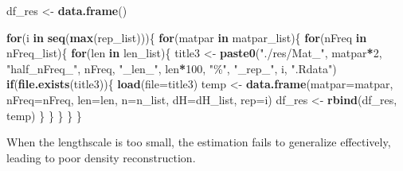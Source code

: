\documentclass[
]{article}
\newenvironment{Shaded}{\begin{snugshade}}{\end{snugshade}}
\newcommand{\AttributeTok}[1]{\textcolor[rgb]{0.13,0.29,0.53}{#1}}
\newcommand{\ControlFlowTok}[1]{\textcolor[rgb]{0.13,0.29,0.53}{\textbf{#1}}}
\newcommand{\DecValTok}[1]{\textcolor[rgb]{0.00,0.00,0.81}{#1}}
\newcommand{\FunctionTok}[1]{\textcolor[rgb]{0.13,0.29,0.53}{\textbf{#1}}}
\newcommand{\NormalTok}[1]{#1}
\newcommand{\OtherTok}[1]{\textcolor[rgb]{0.56,0.35,0.01}{#1}}
\newcommand{\SpecialCharTok}[1]{\textcolor[rgb]{0.81,0.36,0.00}{\textbf{#1}}}
\newcommand{\StringTok}[1]{\textcolor[rgb]{0.31,0.60,0.02}{#1}}
\begin{document}
\begin{Shaded}
\begin{Highlighting}[]
\NormalTok{df\_res }\OtherTok{\textless{}{-}} \FunctionTok{data.frame}\NormalTok{()}

\ControlFlowTok{for}\NormalTok{(i }\ControlFlowTok{in} \FunctionTok{seq}\NormalTok{(}\FunctionTok{max}\NormalTok{(rep\_list)))\{}
  \ControlFlowTok{for}\NormalTok{(matpar }\ControlFlowTok{in}\NormalTok{ matpar\_list)\{}
    \ControlFlowTok{for}\NormalTok{(nFreq }\ControlFlowTok{in}\NormalTok{ nFreq\_list)\{}
      \ControlFlowTok{for}\NormalTok{(len }\ControlFlowTok{in}\NormalTok{ len\_list)\{}
\NormalTok{        title3 }\OtherTok{\textless{}{-}} \FunctionTok{paste0}\NormalTok{(}\StringTok{"./res/Mat\_"}\NormalTok{, matpar}\SpecialCharTok{*}\DecValTok{2}\NormalTok{, }
                         \StringTok{"half\_nFreq\_"}\NormalTok{, nFreq,}
                         \StringTok{"\_len\_"}\NormalTok{, len}\SpecialCharTok{*}\DecValTok{100}\NormalTok{, }\StringTok{"\%"}\NormalTok{,}
                         \StringTok{"\_rep\_"}\NormalTok{, i, }\StringTok{".Rdata"}\NormalTok{)}
        \ControlFlowTok{if}\NormalTok{(}\FunctionTok{file.exists}\NormalTok{(title3))\{}
          \FunctionTok{load}\NormalTok{(}\AttributeTok{file=}\NormalTok{title3)}
\NormalTok{          temp }\OtherTok{\textless{}{-}} \FunctionTok{data.frame}\NormalTok{(}\AttributeTok{matpar=}\NormalTok{matpar,}
                             \AttributeTok{nFreq=}\NormalTok{nFreq,}
                             \AttributeTok{len=}\NormalTok{len,}
                             \AttributeTok{n=}\NormalTok{n\_list, }
                             \AttributeTok{dH=}\NormalTok{dH\_list, }
                             \AttributeTok{rep=}\NormalTok{i)}
\NormalTok{          df\_res }\OtherTok{\textless{}{-}} \FunctionTok{rbind}\NormalTok{(df\_res, temp)}
\NormalTok{        \}}
\NormalTok{      \}}
\NormalTok{    \}}
\NormalTok{  \}}
\NormalTok{\}}
\end{Highlighting}
\end{Shaded}

When the lengthscale is too small, the estimation fails to generalize effectively, leading to poor density reconstruction.
\end{document}

